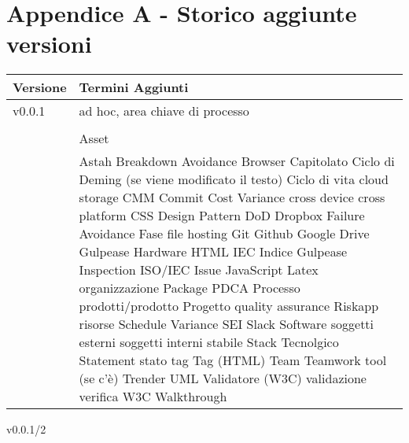 \section{Appendice A - Storico aggiunte versioni}

\begin{table}[h!]
 	\normalsize
		\begin{tabular}{l|l}
			 \textbf{Versione} & \textbf{Termini Aggiunti}  \\
		\midrule


		v0.0.1 &  ad hoc, area chiave di processo \\
		&  \\
 & 		Asset \\


		&

		Astah
		Breakdown Avoidance
		Browser
		Capitolato
		Ciclo di Deming (se viene modificato il testo)
		Ciclo di vita
		cloud storage
		CMM
		Commit
		Cost Variance
		cross device
		cross platform
		CSS
		Design Pattern
		DoD
		Dropbox
		Failure Avoidance
		Fase
		file hosting
		Git
		Github
		Google Drive
		Gulpease
		Hardware
		HTML
		IEC
		Indice Gulpease
		Inspection
		ISO/IEC
		Issue
		JavaScript
		Latex
		organizzazione
		Package
		PDCA
		Processo
		prodotti/prodotto
		Progetto
		quality assurance
		Riskapp
		risorse
		Schedule Variance
		SEI
		Slack
		Software
		soggetti esterni
		soggetti interni
		stabile
		Stack Tecnolgico
		Statement
		stato
		tag
		Tag (HTML)
		Team
		Teamwork
		tool (se c'è)
		Trender
		UML
		Validatore (W3C)
		validazione
		verifica
		W3C
		Walkthrough
	\end{tabular}
\end{table}


 v0.0.1/2
